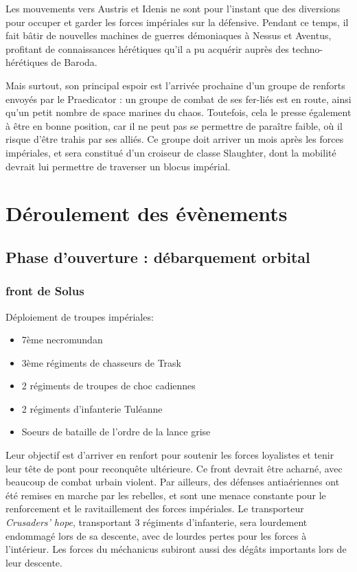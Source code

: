 \documentclass[10pt,a4paper]{book}
\begin{document}
Les mouvements vers Austris et Idenis ne sont pour l'instant que des diversions pour occuper et garder les forces impériales sur la défensive. Pendant ce temps, il fait bâtir de nouvelles machines de guerres démoniaques à Nessus et Aventus, profitant de connaissances hérétiques qu'il a pu acquérir auprès des techno-hérétiques de Baroda.

Mais surtout, son principal espoir est l'arrivée prochaine d'un groupe de renforts envoyés par le Praedicator : un groupe de combat de ses fer-liés est en route, ainsi qu'un petit nombre de space marines du chaos. Toutefois, cela le presse également à être en bonne position, car il ne peut pas se permettre de paraître faible, où il risque d'être trahis par ses alliés. Ce groupe doit arriver un mois après les forces impériales, et sera constitué d'un croiseur de classe Slaughter, dont la mobilité devrait lui permettre de traverser un blocus impérial.
\chapter{Déroulement des évènements}
\section{Phase d'ouverture : débarquement orbital}
\subsection{front de Solus}
Déploiement de troupes impériales:
\begin{itemize}
\item 7ème necromundan
\item 3ème régiments de chasseurs de Trask
\item 2 régiments de troupes de choc cadiennes
\item 2 régiments d'infanterie Tuléanne
\item Soeurs de bataille de l'ordre de la lance grise
\end{itemize}

Leur objectif est d'arriver en renfort pour soutenir les forces loyalistes et tenir leur tête de pont pour reconquête ultérieure.
Ce front devrait être acharné, avec beaucoup de combat urbain violent. Par ailleurs, des défenses antiaériennes ont été remises en marche par les rebelles, et sont une menace constante pour le renforcement et le ravitaillement des forces impériales. Le transporteur \emph{Crusaders' hope}, transportant 3 régiments d'infanterie, sera lourdement endommagé lors de sa descente, avec de lourdes pertes pour les forces à l'intérieur. Les forces du méchanicus subiront aussi des dégâts importants lors de leur descente. 
\end{document}
